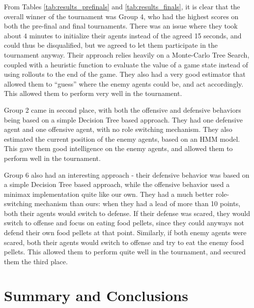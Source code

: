 \documentclass[a4paper,12pt]{article}
\begin{document}
From Tables \ref{tab:results_prefinals} and \ref{tab:results_finals}, it is clear that the overall winner of the tournament was Group 4, who had the highest scores on both the pre-final and final tournaments. 
There was an issue where they took about 4 minutes to initialize their agents instead of the agreed 15 seconds, and could thus be disqualified, but we agreed to let them participate in the tournament anyway. 
Their approach relies heavily on a Monte-Carlo Tree Search, coupled with a heuristic function to evaluate the value of a game state instead of using rollouts to the end of the game. 
They also had a very good estimator that allowed them to ``guess'' where the enemy agents could be, and act accordingly. 
This allowed them to perform very well in the tournament.

Group 2 came in second place, with both the offensive and defensive behaviors being based on a simple Decision Tree based approach. They had one defensive agent and one offensive agent, with no role switching mechanism. They also estimated the current position of the enemy agents, based on an HMM model. This gave them good intelligence on the enemy agents, and allowed them to perform well in the tournament.

Group 6 also had an interesting approach - their defensive behavior was based on a simple Decision Tree based approach, while the offensive behavior used a minimax implementation quite like our own. They had a much better role-switching mechanism than ours: when they had a lead of more than 10 points, both their agents would switch to defense. If their defense was scared, they would switch to offense and focus on eating food pellets, since they could anyways not defend their own food pellets at that point. Similarly, if both enemy agents were scared, both their agents would switch to offense and try to eat the enemy food pellets. This allowed them to perform quite well in the tournament, and secured them the third place.










\section{Summary and Conclusions}
\label{sec:conclusion}
\end{document}
